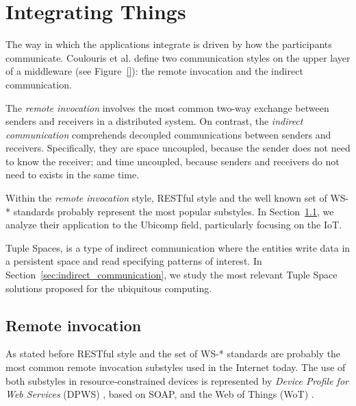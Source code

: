 \section{Integrating Things}
\label{sec:integration}

The way in which the applications integrate is driven by how the participants communicate.
Coulouris et al. \cite{coulouris_distributed_2012} define two communication styles on the upper layer of a middleware (see Figure~\ref{}): %
the remote invocation and the indirect communication.

The \emph{remote invocation} involves the most common two-way exchange between senders and receivers in a distributed system.
On contrast, the \emph{indirect communication} comprehends decoupled communications between senders and receivers.
Specifically, they are space uncoupled, because the sender does not need to know the receiver;
and time uncoupled, because senders and receivers do not need to exists in the same time.

Within the \emph{remote invocation} style, RESTful style and the well known set of WS-* standards probably represent the most popular substyles.
In Section~\ref{sec:remote_invocation}, we analyze their application to the Ubicomp field, particularly focusing on the IoT.

Tuple Spaces, is a type of indirect communication where the entities write data in a persistent space and read specifying patterns of interest.
In Section~\ref{sec:indirect_communication}, we study the most relevant Tuple Space solutions proposed for the ubiquitous computing.


\subsection{Remote invocation}
\label{sec:remote_invocation}

As stated before RESTful style and the set of WS-* standards are probably the most common remote invocation substyles used in the Internet today.
The use of both substyles in resource-constrained devices is represented by \textit{Device Profile for Web Services} (DPWS) \cite{moritz_devices_2010}, based on SOAP,
and the Web of Things (WoT) \cite{guinard_internet_2011}. %


